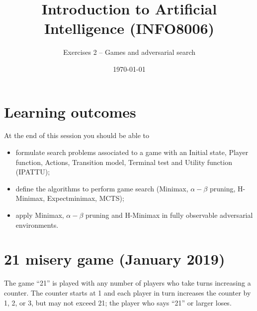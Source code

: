 \documentclass[11pt, a4paper]{article}
\title{Introduction to Artificial Intelligence (INFO8006)}
\subtitle{Exercises 2 -- Games and adversarial search}
\date{\today}
\begin{document}
\maketitle

\section*{Learning outcomes}

At the end of this session you should be able to
\begin{itemize}[noitemsep]
    \item formulate search problems associated to a game with an Initial state, Player function, Actions, Transition model, Terminal test and Utility function (IPATTU);
    \item define the algorithms to perform game search (Minimax, $\alpha - \beta$ pruning, H-Minimax, Expectminimax, MCTS);
    \item apply Minimax, $\alpha - \beta$ pruning and H-Minimax in fully observable adversarial environments.
\end{itemize}

\section{21 misery game (January 2019)}

The game \enquote{21} is played with any number of players who take turns increasing a counter. The counter starts at 1 and each player in turn increases the counter by 1, 2, or 3, but may not exceed 21; the player who says \enquote{21} or larger loses.
\end{document}
